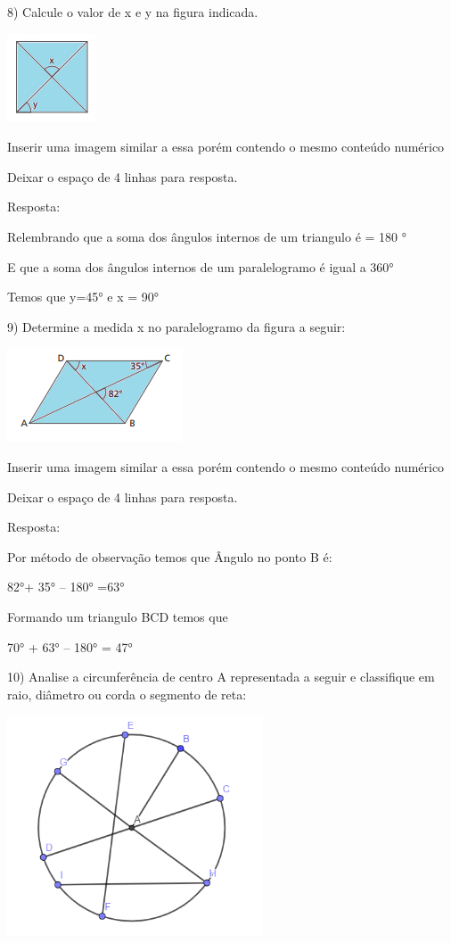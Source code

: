 {8) Calcule o valor de x e y na figura indicada.

\includegraphics[width=1.03125in,height=1.03125in]{./imgSAEB_8_MAT/media/image10.png}

Inserir uma imagem similar a essa porém contendo o mesmo conteúdo
numérico

Deixar o espaço de 4 linhas para resposta.

Resposta:

Relembrando que a soma dos ângulos internos de um triangulo é = 180 °

E que a soma dos ângulos internos de um paralelogramo é igual a 360°

Temos que y=45° e x = 90°

9) Determine a medida x no paralelogramo da figura a seguir:

\includegraphics[width=2.05208in,height=1.09375in]{./imgSAEB_8_MAT/media/image11.png}

Inserir uma imagem similar a essa porém contendo o mesmo conteúdo
numérico

Deixar o espaço de 4 linhas para resposta.

Resposta:

Por método de observação temos que Ângulo no ponto B é:

82°+ 35° -- 180° =63°

Formando um triangulo BCD temos que

70° + 63° -- 180° = 47°

10) Analise a circunferência de centro A representada a seguir e
classifique em raio, diâmetro ou corda o segmento de reta:

\includegraphics[width=2.98681in,height=2.57292in]{./imgSAEB_8_MAT/media/image12.png}

}
